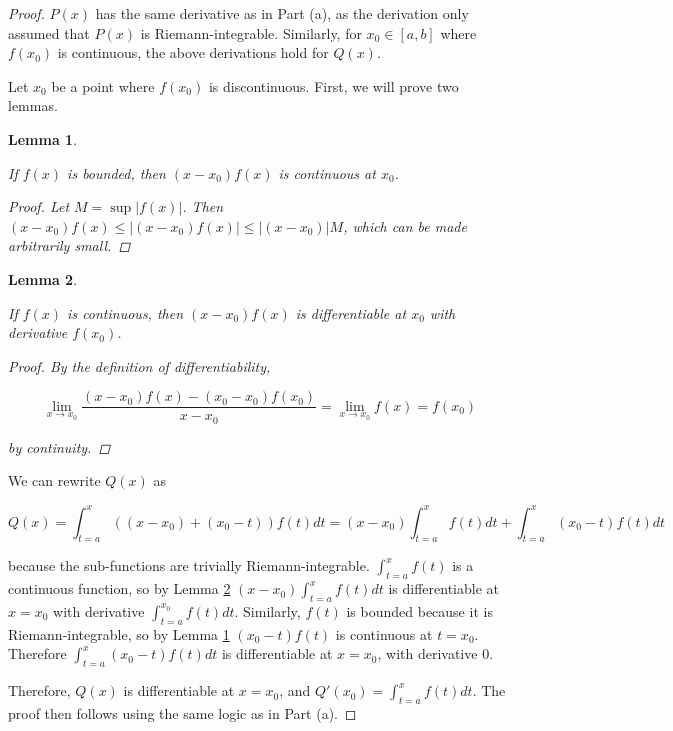 \documentclass{amsart}
\newtheorem{lemma}{Lemma}[subsubsection]
\begin{document}
\begin{proof}

$P(x)$ has the same derivative as in Part (a), as the derivation only assumed that $P(x)$ is Riemann-integrable. Similarly, for $x_0 \in [a, b]$ where $f(x_0)$ is continuous, the above derivations hold for $Q(x)$.

Let $x_0$ be a point where $f(x_0)$ is discontinuous. First, we will prove two lemmas.

\begin{lemma}
\label{boundedIsCont}

If $f(x)$ is bounded, then $(x - x_0) f(x)$ is continuous at $x_0$.

\begin{proof}

Let $M = \sup |f(x)|$. Then $(x - x_0) f(x) \leq |(x - x_0) f(x)| \leq |(x - x_0)| M$, which can be made arbitrarily small.

\end{proof}
\end{lemma}

\begin{lemma}
\label{contIsDiff}

If $f(x)$ is continuous, then $(x - x_0) f(x)$ is differentiable at $x_0$ with derivative $f(x_0)$.

\begin{proof}

By the definition of differentiability,

\[
\lim_{x \to x_0} \frac{(x - x_0) f(x) - (x_0 - x_0) f(x_0)}{x - x_0}
= \lim_{x \to x_0} f(x) = f(x_0)
\]

by continuity.

\end{proof}
\end{lemma}

We can rewrite $Q(x)$ as

\[
Q(x) = \int_{t=a}^x ((x-x_0) + (x_0-t)) f(t) dt
= (x-x_0) \int_{t=a}^x f(t) dt + \int_{t=a}^x (x_0-t)f(t) dt
\]

because the sub-functions are trivially Riemann-integrable. $\int_{t=a}^x f(t)$ is a continuous function, so by Lemma \ref{contIsDiff} $(x-x_0) \int_{t=a}^x f(t) dt$ is differentiable at $x = x_0$ with derivative $\int_{t=a}^{x_0} f(t) dt$. Similarly, $f(t)$ is bounded because it is Riemann-integrable, so by Lemma \ref{boundedIsCont} $(x_0-t)f(t)$ is continuous at $t = x_0$. Therefore $\int_{t=a}^x (x_0-t)f(t) dt$ is differentiable at $x = x_0$, with derivative $0$.

Therefore, $Q(x)$ is differentiable at $x = x_0$, and $Q'(x_0) = \int_{t=a}^x f(t) dt$. The proof then follows using the same logic as in Part (a).

\end{proof}
\end{document}
